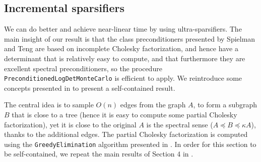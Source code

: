 
\subsection{Incremental sparsifiers\label{sec:Incremental-sparsifiers}}

We can do better and achieve near-linear time by using ultra-sparsifiers.
The main insight of our result is that the class preconditioners presented
by Spielman and Teng are based on incomplete Cholesky factorization,
and hence have a determinant that is relatively easy to compute, and
that furthermore they are excellent spectral preconditioners, so the
procedure \texttt{PreconditionedLogDetMonteCarlo} is efficient to
apply. We reintroduce some concepts presented in \cite{Koutis2010}
to present a self-contained result.

The central idea is to sample $O\left(n\right)$ edges from the graph
$A$, to form a subgraph $B$ that is close to a tree (hence it is
easy to compute some partial Cholesky factorization), yet it is close
to the original $A$ is the spectral sense ($A\preceq B\preceq\kappa A$),
thanks to the additional edges. The partial Cholesky factorization
is computed using the \texttt{GreedyElimination} algorithm presented
in \cite{Koutis2010}. In order for this section to be self-contained,
we repeat the main results of Section 4 in \cite{Spielman2009a}.

